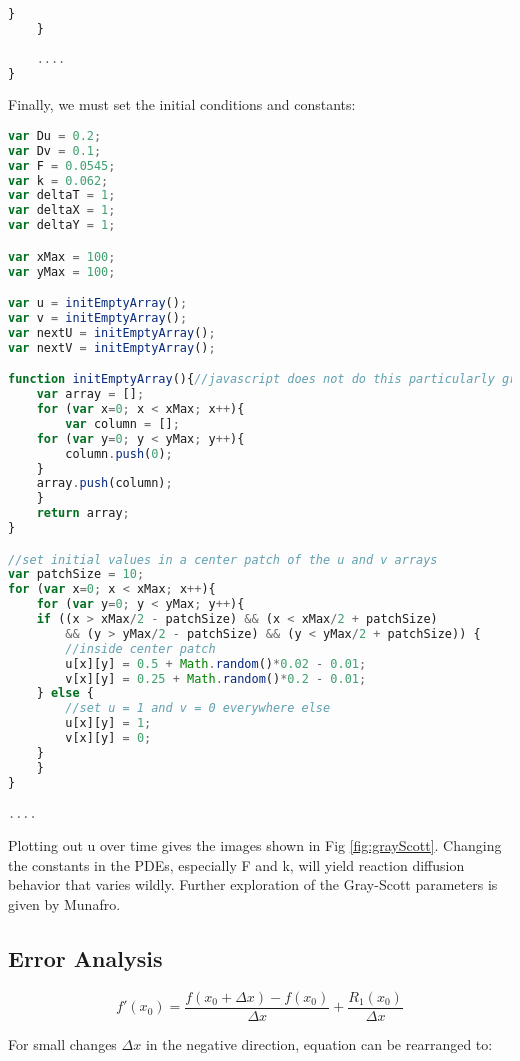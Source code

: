 {\begin{lstlisting}[language=JavaScript]
    	}
    }
    
    ....
}
\end{lstlisting}

Finally, we must set the initial conditions and constants:\\
\begin{lstlisting}[language=JavaScript]
var Du = 0.2;
var Dv = 0.1;
var F = 0.0545;
var k = 0.062;
var deltaT = 1;
var deltaX = 1;
var deltaY = 1;

var xMax = 100;
var yMax = 100;

var u = initEmptyArray();
var v = initEmptyArray();
var nextU = initEmptyArray();
var nextV = initEmptyArray();

function initEmptyArray(){//javascript does not do this particularly gracefully
    var array = [];
    for (var x=0; x < xMax; x++){
    	var column = [];
	for (var y=0; y < yMax; y++){
	    column.push(0);
	}
	array.push(column);
    }
    return array;
}

//set initial values in a center patch of the u and v arrays
var patchSize = 10;
for (var x=0; x < xMax; x++){
    for (var y=0; y < yMax; y++){
	if ((x > xMax/2 - patchSize) && (x < xMax/2 + patchSize) 
	    && (y > yMax/2 - patchSize) && (y < yMax/2 + patchSize)) {
	    //inside center patch
	    u[x][y] = 0.5 + Math.random()*0.02 - 0.01;
	    v[x][y] = 0.25 + Math.random()*0.2 - 0.01;
	} else {
	    //set u = 1 and v = 0 everywhere else
	    u[x][y] = 1;
	    v[x][y] = 0;
	}
    }
}

....

\end{lstlisting}

Plotting out u over time gives the images shown in Fig \ref{fig:grayScott}.  Changing the constants in the PDEs, especially F and k, will yield reaction diffusion behavior that varies wildly.  Further exploration of the Gray-Scott parameters is given by Munafro\cite{Munafo2016}.

\subsection{Error Analysis}\label{sec:errorAnalysis}

 \begin{equation}
 f'(x_{0}) = \frac{f(x_{0} + \Delta  x) - f(x_{0})}{\Delta  x} + \frac{R_{1}(x_{0})}{\Delta  x}
  \end{equation}
  
For small changes $\Delta  x$ in the negative direction, equation  can be rearranged to:

}
